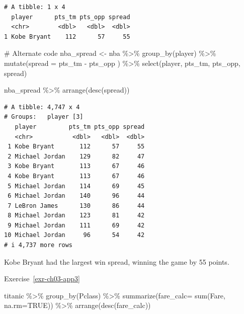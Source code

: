 \documentclass[
  letterpaper,
  DIV=11,
  numbers=noendperiod]{scrreprt}
\newenvironment{Shaded}{\begin{snugshade}}{\end{snugshade}}
\newcommand{\AttributeTok}[1]{\textcolor[rgb]{0.40,0.45,0.13}{#1}}
\newcommand{\CommentTok}[1]{\textcolor[rgb]{0.37,0.37,0.37}{#1}}
\newcommand{\ConstantTok}[1]{\textcolor[rgb]{0.56,0.35,0.01}{#1}}
\newcommand{\FunctionTok}[1]{\textcolor[rgb]{0.28,0.35,0.67}{#1}}
\newcommand{\NormalTok}[1]{\textcolor[rgb]{0.00,0.23,0.31}{#1}}
\newcommand{\OtherTok}[1]{\textcolor[rgb]{0.00,0.23,0.31}{#1}}
\newcommand{\SpecialCharTok}[1]{\textcolor[rgb]{0.37,0.37,0.37}{#1}}
\theoremstyle{definition}
\theoremstyle{remark}
\begin{document}
\begin{verbatim}
# A tibble: 1 x 4
  player      pts_tm pts_opp spread
  <chr>        <dbl>   <dbl>  <dbl>
1 Kobe Bryant    112      57     55
\end{verbatim}

\begin{Shaded}
\begin{Highlighting}[]
\CommentTok{\# Alternate code}
\NormalTok{nba\_spread }\OtherTok{\textless{}{-}}\NormalTok{ nba }\SpecialCharTok{\%\textgreater{}\%}
  \FunctionTok{group\_by}\NormalTok{(player) }\SpecialCharTok{\%\textgreater{}\%}
  \FunctionTok{mutate}\NormalTok{(}\AttributeTok{spread =}\NormalTok{ pts\_tm }\SpecialCharTok{{-}}\NormalTok{ pts\_opp ) }\SpecialCharTok{\%\textgreater{}\%} 
  \FunctionTok{select}\NormalTok{(player, pts\_tm, pts\_opp, spread)}

\NormalTok{nba\_spread }\SpecialCharTok{\%\textgreater{}\%} \FunctionTok{arrange}\NormalTok{(}\FunctionTok{desc}\NormalTok{(spread))}
\end{Highlighting}
\end{Shaded}

\begin{verbatim}
# A tibble: 4,747 x 4
# Groups:   player [3]
   player         pts_tm pts_opp spread
   <chr>           <dbl>   <dbl>  <dbl>
 1 Kobe Bryant       112      57     55
 2 Michael Jordan    129      82     47
 3 Kobe Bryant       113      67     46
 4 Kobe Bryant       113      67     46
 5 Michael Jordan    114      69     45
 6 Michael Jordan    140      96     44
 7 LeBron James      130      86     44
 8 Michael Jordan    123      81     42
 9 Michael Jordan    111      69     42
10 Michael Jordan     96      54     42
# i 4,737 more rows
\end{verbatim}

Kobe Bryant had the largest win spread, winning the game by 55 points.

Exercise~\ref{exr-ch03-app3}

\begin{Shaded}
\begin{Highlighting}[]
\NormalTok{titanic }\SpecialCharTok{\%\textgreater{}\%}
  \FunctionTok{group\_by}\NormalTok{(Pclass) }\SpecialCharTok{\%\textgreater{}\%} 
  \FunctionTok{summarize}\NormalTok{(}\AttributeTok{fare\_calc=} \FunctionTok{sum}\NormalTok{(Fare, }\AttributeTok{na.rm=}\ConstantTok{TRUE}\NormalTok{)) }\SpecialCharTok{\%\textgreater{}\%}
  \FunctionTok{arrange}\NormalTok{(}\FunctionTok{desc}\NormalTok{(fare\_calc))}
\end{Highlighting}
\end{Shaded}
\end{document}
